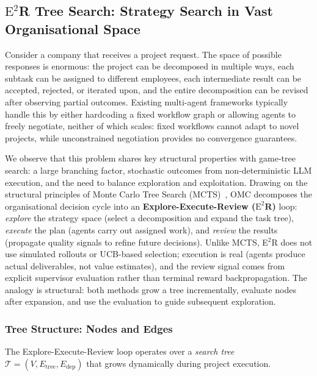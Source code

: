 \documentclass[11pt,a4paper]{article}
\begin{document}
\subsection{$\text{E}^2$R Tree Search: Strategy Search in Vast Organisational Space}
\label{sec:explore-review}

Consider a company that receives a project request. The space of possible responses is enormous: the project can be decomposed in multiple ways, each subtask can be assigned to different employees, each intermediate result can be accepted, rejected, or iterated upon, and the entire decomposition can be revised after observing partial outcomes. Existing multi-agent frameworks typically handle this by either hardcoding a fixed workflow graph or allowing agents to freely negotiate, neither of which scales: fixed workflows cannot adapt to novel projects, while unconstrained negotiation provides no convergence guarantees.

We observe that this problem shares key structural properties with game-tree search: a large branching factor, stochastic outcomes from non-deterministic LLM execution, and the need to balance exploration and exploitation. Drawing on the structural principles of Monte Carlo Tree Search (MCTS)~\cite{kocsis2006bandit}, OMC decomposes the organisational decision cycle into an \textbf{Explore-Execute-Review ($\text{E}^2$R)} loop: \emph{explore} the strategy space (select a decomposition and expand the task tree), \emph{execute} the plan (agents carry out assigned work), and \emph{review} the results (propagate quality signals to refine future decisions).  Unlike MCTS, E$^2$R does not use simulated rollouts or UCB-based selection; execution is real (agents produce actual deliverables, not value estimates), and the review signal comes from explicit supervisor evaluation rather than terminal reward backpropagation.  The analogy is structural: both methods grow a tree incrementally, evaluate nodes after expansion, and use the evaluation to guide subsequent exploration.

\subsubsection{Tree Structure: Nodes and Edges}

The Explore-Execute-Review loop operates over a \emph{search tree} $\mathcal{T} = (V, E_{\text{tree}}, E_{\text{dep}})$ that grows dynamically during project execution.
\end{document}
